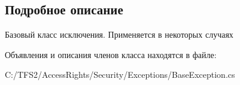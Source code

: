 \subsection{Подробное описание}
Базовый класс исключения. Применяется в некоторых случаях 



Объявления и описания членов класса находятся в файле\+:\begin{DoxyCompactItemize}
\item 
C\+:/\+T\+F\+S2/\+Access\+Rights/\+Security/\+Exceptions/Base\+Exception.\+cs\end{DoxyCompactItemize}
